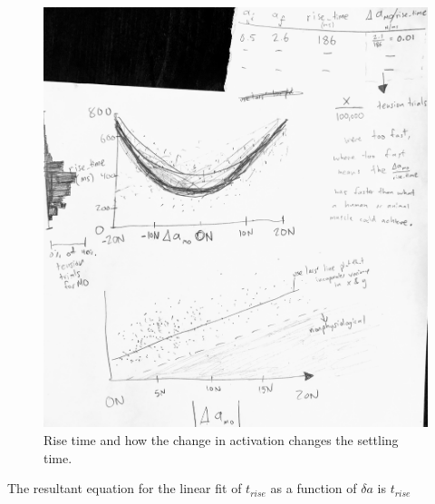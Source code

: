 \documentclass[utf8]{frontiersSCNS} %
\begin{document}
\begin{figure}[h!]
\begin{center}
\includegraphics[width=17.5cm]{figures/rise_time_and_delta_activation/rise_time_and_delta_activation.jpg}%
\end{center}
\caption{Rise time and how the change in activation changes the settling time. }
\label{fig:rise_time_and_delta_activation}
\end{figure}

The resultant equation for the linear fit of $t_{rise}$ as a function of $\delta a$ is $t_{rise}$
\end{document}
